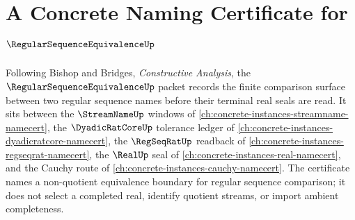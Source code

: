 \chapter{A Concrete Naming Certificate for $\RegularSequenceEquivalenceUp$}
\label{ch:concrete-instances-regular-sequence-equivalence-namecert}

Following Bishop and Bridges, \emph{Constructive Analysis}, the $\RegularSequenceEquivalenceUp$ packet records the finite comparison surface between two regular sequence names before their terminal real seals are read. It sits between the $\StreamNameUp$ windows of \autoref{ch:concrete-instances-streamname-namecert}, the $\DyadicRatCoreUp$ tolerance ledger of \autoref{ch:concrete-instances-dyadicratcore-namecert}, the $\RegSeqRatUp$ readback of \autoref{ch:concrete-instances-regseqrat-namecert}, the $\RealUp$ seal of \autoref{ch:concrete-instances-real-namecert}, and the Cauchy route of \autoref{ch:concrete-instances-cauchy-namecert}. The certificate names a non-quotient equivalence boundary for regular sequence comparison; it does not select a completed real, identify quotient streams, or import ambient completeness.

